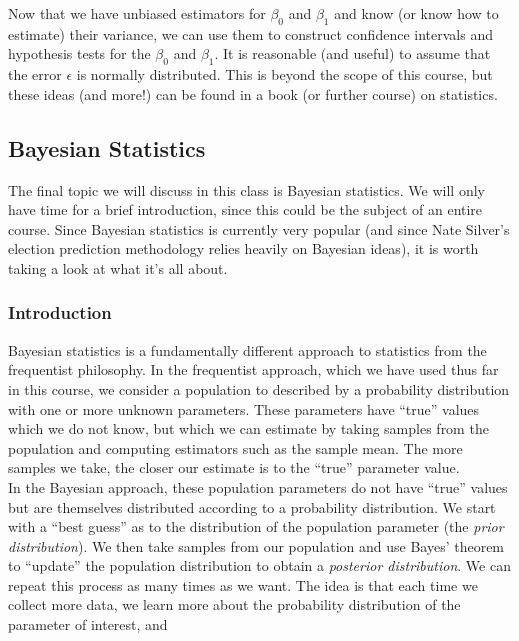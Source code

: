 \documentclass[12pt]{article}
\theoremstyle{definition}
\theoremstyle{remark}
\begin{document}
Now that we have unbiased estimators for $\beta_0$ and $\beta_1$ and know (or know how to estimate) their variance, we can use them to construct confidence intervals and hypothesis tests for the $\beta_0$ and $\beta_1$. It is reasonable (and useful) to assume that the error $\epsilon$ is normally distributed. This is beyond the scope of this course, but these ideas (and more!) can be found in a book (or further course) on statistics.

\subsection{Bayesian Statistics}
The final topic we will discuss in this class is Bayesian statistics. We will only have time for a brief introduction, since this could be the subject of an entire course. Since Bayesian statistics is currently very popular (and since Nate Silver's election prediction methodology relies heavily on Bayesian ideas), it is worth taking a look at what it's all about.

\subsubsection{Introduction}
Bayesian statistics is a fundamentally different approach to statistics from the frequentist philosophy. In the frequentist approach, which we have used thus far in this course, we consider a population to described by a probability distribution with one or more unknown parameters. These parameters have ``true'' values which we do not know, but which we can estimate by taking samples from the population and computing estimators such as the sample mean. The more samples we take, the closer our estimate is to the ``true'' parameter value.\\

In the Bayesian approach, these population parameters do not have ``true'' values but are themselves distributed according to a probability distribution. We start with a ``best guess'' as to the distribution of the population parameter (the \emph{prior distribution}). We then take samples from our population and use Bayes' theorem to ``update'' the population distribution to obtain a \emph{posterior distribution}. We can repeat this process as many times as we want. The idea is that each time we collect more data, we learn more about the probability distribution of the parameter of interest, and \\
\end{document}

